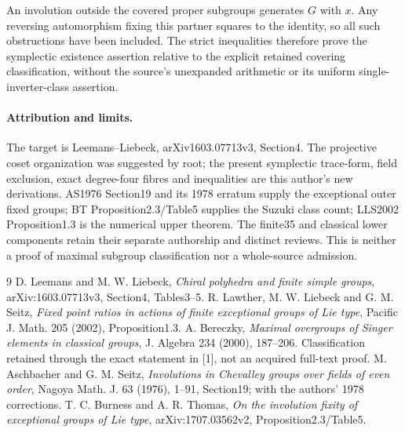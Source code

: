 \documentclass[10pt]{article}
\begin{document}
An involution outside the covered proper subgroups generates $G$ with $x$.
Any reversing automorphism fixing this partner squares to the identity,
so all such obstructions have been included. The strict inequalities
therefore prove the symplectic existence assertion relative to the
explicit retained covering classification, without the source's unexpanded arithmetic
or its uniform single-inverter-class assertion.

\paragraph{Attribution and limits.}
The target is Leemans--Liebeck, arXiv1603.07713v3, Section4. The projective
coset organization was suggested by root; the present symplectic trace-form,
field exclusion, exact degree-four fibres and inequalities are this author's
new derivations. AS1976 Section19 and its 1978 erratum supply the exceptional
outer fixed groups; BT Proposition2.3/Table5 supplies the Suzuki class count;
LLS2002 Proposition1.3 is the numerical upper theorem. The finite35 and
classical lower components retain their separate authorship and distinct
reviews. This is neither a proof of maximal subgroup classification nor a
whole-source admission.
\begin{thebibliography}{9}
 D. Leemans and M. W. Liebeck, \emph{Chiral polyhedra and finite
simple groups}, arXiv:1603.07713v3, Section4, Tables3--5.
 R. Lawther, M. W. Liebeck and G. M. Seitz,
\emph{Fixed point ratios in actions of finite exceptional groups of Lie type},
Pacific J. Math. 205 (2002), Proposition1.3.
 A. Bereczky, \emph{Maximal overgroups of Singer elements in
classical groups}, J. Algebra 234 (2000), 187--206. Classification retained
through the exact statement in [1], not an acquired full-text proof.
 M. Aschbacher and G. M. Seitz, \emph{Involutions in Chevalley
groups over fields of even order}, Nagoya Math. J. 63 (1976), 1--91,
Section19; with the authors' 1978 corrections.
 T. C. Burness and A. R. Thomas, \emph{On the involution fixity
of exceptional groups of Lie type}, arXiv:1707.03562v2, Proposition2.3/Table5.
\end{thebibliography}
\end{document}
